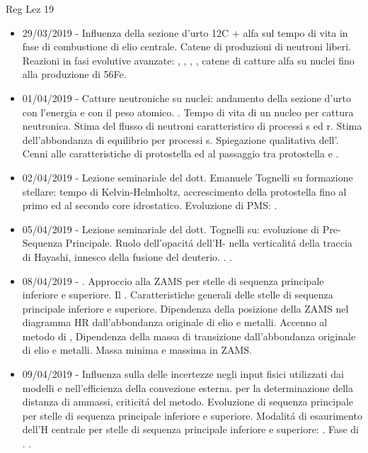 \begin{frame}[allowframebreaks]{Reg Lez 19}
\begin{itemize}
\item 29/03/2019 - Influenza della sezione d'urto 12C + alfa sul tempo di vita in fase di combustione di elio centrale. Catene di {produzioni di neutroni liberi}. Reazioni in fasi evolutive avanzate: , ,  , , catene di catture alfa su nuclei fino alla {produzione di 56Fe}.
\item 01/04/2019 - Catture neutroniche su nuclei: andamento della sezione d'urto con l'energia e con il peso atomico. . Tempo di vita di un nucleo per cattura neutronica. Stima del flusso di neutroni caratteristico di processi s ed r. Stima dell'abbondanza di equilibrio per processi s. Spiegazione qualitativa dell'. Cenni alle caratteristiche di protostella ed al passaggio tra protostella e .
\item 02/04/2019 - Lezione seminariale del dott. Emanuele Tognelli su formazione stellare: tempo di Kelvin-Helmholtz, accrescimento della protostella fino al primo ed al secondo core idrostatico. Evoluzione di PMS: .
\item 05/04/2019 - Lezione seminariale del dott. Tognelli su: evoluzione di Pre-Sequenza Principale. Ruolo dell'opacit\'a dell'H- nella verticalit\'a della traccia di Hayashi, innesco della fusione del deuterio. . .
\item 08/04/2019 - . Approccio alla ZAMS per stelle di sequenza principale inferiore e superiore. Il . Caratteristiche generali delle stelle di sequenza principale inferiore e superiore. Dipendenza della posizione della ZAMS nel diagramma HR dall'abbondanza originale di elio e metalli. Accenno al metodo di , Dipendenza della massa di transizione dall'abbondanza originale di elio e metalli. Massa minima e massima in ZAMS.
\item 09/04/2019 - Influenza sulla  delle incertezze negli input fisici utilizzati dai modelli e nell'efficienza della convezione esterna.  per la determinazione della distanza di ammassi, criticit\'a del metodo. Evoluzione di sequenza principale per stelle di sequenza principale inferiore e superiore. Modalit\'a di esaurimento dell'H centrale per stelle di sequenza principale inferiore e superiore: . Fase di . .

\end{itemize}
\end{frame}
